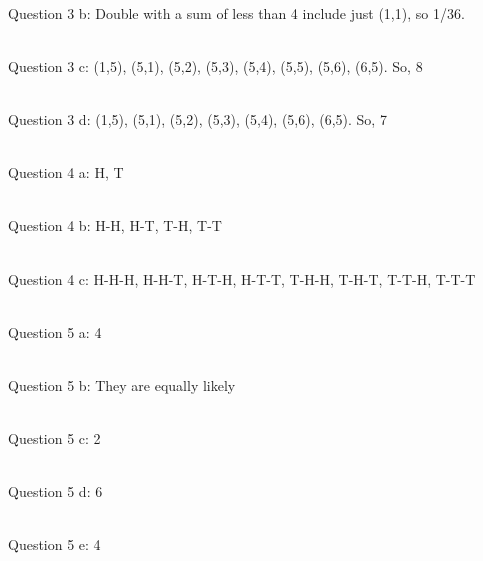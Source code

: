 {    ~\\ Question 3 b:   Double with a sum of less than 4 include just (1,1), so 1/36.

    ~\\ Question 3 c:   (1,5), (5,1), (5,2), (5,3), (5,4), (5,5), (5,6), (6,5).
                        So, 8

    ~\\ Question 3 d:   (1,5), (5,1), (5,2), (5,3), (5,4), (5,6), (6,5).
                        So, 7

    ~\\ Question 4 a:   H, T
    
    ~\\ Question 4 b:   H-H, H-T, T-H, T-T
    
    ~\\ Question 4 c:   H-H-H, H-H-T, H-T-H, H-T-T, T-H-H, T-H-T, T-T-H, T-T-T

    ~\\ Question 5 a:   4
    
    ~\\ Question 5 b:   They are equally likely
    
    ~\\ Question 5 c:   2
    
    ~\\ Question 5 d:   6
    
    ~\\ Question 5 e:   4
}

    


